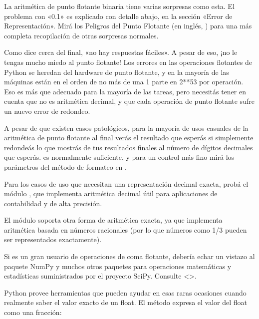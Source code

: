 \documentclass[a4,10pt,spanish]{sphinxmanual}
\begin{document}
\sphinxAtStartPar
La aritmética de punto flotante binaria tiene varias sorpresas como esta. El problema con «0.1» es explicado con detalle abajo, en la sección «Error de Representación».  Mirá los Peligros del Punto Flotante (en inglés, ) para una más completa recopilación de otras sorpresas normales.

\sphinxAtStartPar
Como dice cerca del final, «no hay respuestas fáciles».  A pesar de eso, ¡no le tengas mucho miedo al punto flotante!  Los errores en las operaciones flotantes de Python se heredan del hardware de punto flotante, y en la mayoría de las máquinas están en el orden de no más de una 1 parte en 2**53 por operación.  Eso es más que adecuado para la mayoría de las tareas, pero necesitás tener en cuenta que no es aritmética decimal, y que cada operación de punto flotante sufre un nuevo error de redondeo.

\sphinxAtStartPar
A pesar de que existen casos patológicos, para la mayoría de usos casuales de la aritmética de punto flotante al final verás el resultado que esperás si simplemente redondeás lo que mostrás de tus resultados finales al número de dígitos decimales que esperás.   es normalmente suficiente, y para un control más fino mirá los parámetros del método de formateo  en .

\sphinxAtStartPar
Para los casos de uso que necesitan una representación decimal exacta, probá el módulo , que implementa aritmética decimal útil para aplicaciones de contabilidad y de alta precisión.

\sphinxAtStartPar
El módulo  soporta otra forma de aritmética exacta, ya que implementa aritmética basada en números racionales (por lo que números como 1/3 pueden ser representados exactamente).

\sphinxAtStartPar
Si es un gran usuario de operaciones de coma flotante, debería echar un vistazo al paquete NumPy y muchos otros paquetes para operaciones matemáticas y estadísticas suministrados por el proyecto SciPy. Consulte <>.

\sphinxAtStartPar
Python provee herramientas que pueden ayudar en esas raras ocasiones cuando realmente  saber el valor exacto de un float. El método  expresa el valor del float como una fracción:
\end{document}
